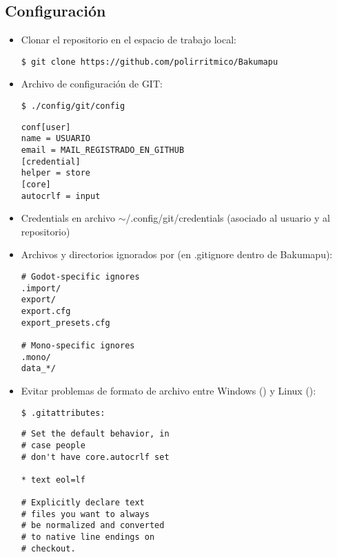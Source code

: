 
\subsection{Configuración}

\begin{itemize}[label=-]

\item Clonar el repositorio en el espacio de trabajo local:
\begin{lstlisting}
$ git clone https://github.com/polirritmico/Bakumapu
\end{lstlisting}

\item Archivo de configuración de GIT:
\begin{lstlisting}
$ ./config/git/config
\end{lstlisting}

\begin{lstlisting}
conf[user]
name = USUARIO
email = MAIL_REGISTRADO_EN_GITHUB
[credential]
helper = store
[core]
autocrlf = input
\end{lstlisting}

\item Credentials en archivo $\sim$/.config/git/credentials (asociado al usuario y al repositorio)

\item Archivos y directorios ignorados por  (en .gitignore dentro de Bakumapu):
\begin{lstlisting}
# Godot-specific ignores
.import/
export/
export.cfg
export_presets.cfg

# Mono-specific ignores
.mono/
data_*/
\end{lstlisting}


\item Evitar problemas de formato de archivo entre Windows () y Linux ():
\begin{lstlisting}
$ .gitattributes:
\end{lstlisting}
\noindent\begin{minipage}{.45\textwidth}
\begin{lstlisting}
# Set the default behavior, in
# case people
# don't have core.autocrlf set

* text eol=lf

# Explicitly declare text
# files you want to always
# be normalized and converted 
# to native line endings on
# checkout.


\end{lstlisting}
\end{minipage}
\end{itemize}
